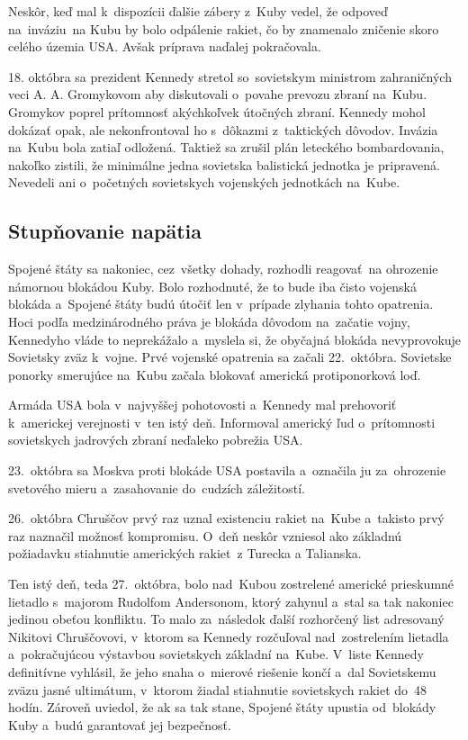 \documentclass[a4paper]{article}
\begin{document}
Neskôr, keď mal k~dispozícii ďalšie zábery z~Kuby vedel, že odpoveď na~inváziu~na Kubu by bolo odpálenie rakiet, čo by znamenalo zničenie skoro celého územia USA. Avšak príprava naďalej pokračovala.

18. októbra sa prezident Kennedy stretol so~sovietskym ministrom zahraničných veci A. A. Gromykovom aby diskutovali o~povahe prevozu zbraní na~Kubu. Gromykov poprel prítomnosť akýchkoľvek útočných zbraní. Kennedy mohol dokázať opak, ale nekonfrontoval ho s~dôkazmi z~taktických dôvodov. Invázia na~Kubu bola zatiaľ odložená. Taktiež sa zrušil plán leteckého bombardovania, nakoľko zistili, že minimálne jedna sovietska balistická jednotka je pripravená. Nevedeli ani o~početných sovietskych vojenských jednotkách na~Kube.

\subsection{Stupňovanie napätia}
Spojené štáty sa nakoniec, cez~všetky dohady, rozhodli reagovať~na ohrozenie námornou blokádou Kuby. Bolo rozhodnuté, že to bude iba čisto vojenská blokáda a~Spojené štáty budú útočiť len v~prípade zlyhania tohto opatrenia. Hoci podľa medzinárodného práva je blokáda dôvodom na~začatie vojny, Kennedyho vláde to neprekážalo a~myslela si, že obyčajná blokáda nevyprovokuje Sovietsky zväz k~vojne. Prvé vojenské opatrenia sa začali 22.~októbra. Sovietske ponorky smerujúce na~Kubu začala blokovať americká protiponorková loď.

Armáda USA bola v~najvyššej pohotovosti a~Kennedy mal prehovoriť k~americkej verejnosti v~ten istý deň. Informoval americký ľud o~prítomnosti sovietskych jadrových zbraní neďaleko pobrežia USA.

23.~októbra sa Moskva proti blokáde USA postavila a~označila ju za~ohrozenie svetového mieru a~zasahovanie do~cudzích záležitostí.

26.~októbra Chruščov prvý raz uznal existenciu rakiet na~Kube a~takisto prvý raz naznačil možnosť kompromisu. O~deň neskôr vzniesol ako základnú požiadavku stiahnutie amerických rakiet~z Turecka a Talianska. 

Ten istý deň, teda 27.~októbra, bolo nad~Kubou zostrelené americké prieskumné lietadlo s~majorom Rudolfom Andersonom, ktorý zahynul a~stal sa tak nakoniec jedinou obeťou konfliktu. To malo za~následok ďalší rozhorčený list adresovaný Nikitovi Chruščovovi, v~ktorom sa Kennedy rozčuľoval nad~zostrelením lietadla a~pokračujúcou výstavbou sovietskych základní na~Kube. V~liste Kennedy definitívne vyhlásil, že jeho snaha o~mierové riešenie končí a~dal Sovietskemu zväzu jasné ultimátum, v~ktorom žiadal stiahnutie sovietskych rakiet do~48 hodín. Zároveň uviedol, že ak sa tak stane, Spojené štáty upustia od~blokády Kuby a~budú garantovať jej bezpečnosť.
\end{document}
